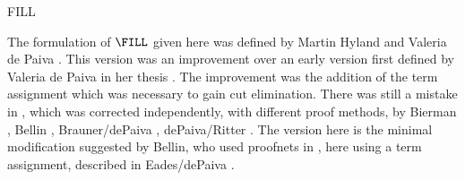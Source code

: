 \begin{entry}{FILL}
\begin{history}
  The formulation of $\FILL$ given here was defined by Martin Hyland
  and Valeria de Paiva \cite{Hyland:1993}.  This version was an
  improvement over an early version first defined by Valeria de Paiva
  in her thesis \cite{dePaiva:1990}.  The improvement was the addition
  of the term assignment which was necessary to gain cut elimination.
  There was still a mistake in \cite{Hyland:1993}, which was corrected
  independently, with different proof methods, by
  Bierman \cite{Bierman:1996}, Bellin \cite{Bellin:1997},
  Brauner/dePaiva \cite{Brauner:1998},
  dePaiva/Ritter \cite{dePaiva:2006}. The version here is the minimal
  modification suggested by Bellin, who used proofnets
  in \cite{Bellin:1997}, here using a term assignment, described in
  Eades/dePaiva \cite{Eades:2015}.
\end{history}



%
%
%
%
%
%
% 
%




\end{entry}
